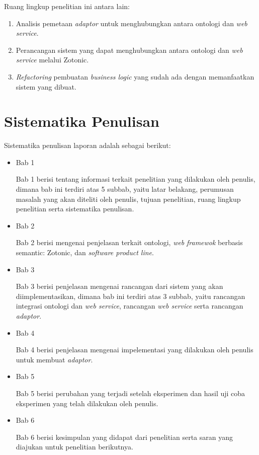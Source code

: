 Ruang lingkup penelitian ini antara lain:
\begin{enumerate}
\item Analisis pemetaan \textit{adaptor} untuk menghubungkan antara ontologi dan \textit{web service}.
\item Perancangan sistem yang dapat menghubungkan antara ontologi dan \textit{web service} melalui Zotonic.
\item \textit{Refactoring} pembuatan \textit{business logic} yang sudah ada dengan memanfaatkan sistem yang dibuat.
\end{enumerate}

\section{Sistematika Penulisan}
Sistematika penulisan laporan adalah sebagai berikut:
\begin{itemize}
	\item Bab 1 \babSatu
	
	Bab 1 berisi tentang informasi terkait penelitian yang dilakukan oleh penulis, dimana bab ini terdiri atas 5 subbab, yaitu latar belakang, perumusan masalah yang akan diteliti oleh penulis, tujuan penelitian, ruang lingkup penelitian serta sistematika penulisan.\\
	\item Bab 2 \babDua
	
	Bab 2 berisi mengenai penjelasan terkait ontologi, \textit{web} \textit{framewok} berbasis semantic: Zotonic, dan \textit{software product line}.\\
	\item Bab 3 \babTiga 
	
	Bab 3 berisi penjelasan mengenai rancangan dari sistem yang akan diimplementasikan, dimana bab ini terdiri atas 3 subbab, yaitu rancangan integrasi ontologi dan \textit{web service}, rancangan \textit{web service} serta rancangan \textit{adaptor}.\\
	
	\item Bab 4 \babEmpat
	
	Bab 4 berisi penjelasan mengenai impelementasi yang dilakukan oleh penulis untuk membuat \textit{adaptor}. \\
	
	\item Bab 5 \babLima	
	
	Bab 5 berisi perubahan yang terjadi setelah eksperimen dan hasil uji coba eksperimen yang telah dilakukan oleh penulis. \\
	
	\item Bab 6 \babEnam
	
	Bab 6 berisi kesimpulan yang didapat dari penelitian serta saran yang diajukan untuk penelitian berikutnya.
\end{itemize}